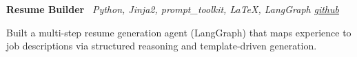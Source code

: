     \hspace{0.5em} \textbf{Resume Builder} \textbar \  \textit{Python, Jinja2, prompt\_toolkit, LaTeX, LangGraph}
\hfill \textit{\href{https://github.com/knarfthekant/resume_builder}{github}}
    \vspace{0.10 cm}
    \begin{onecolentry}
        \begin{highlights}
            \item Built a multi-step resume generation agent (LangGraph) that maps experience to job descriptions via structured reasoning and template-driven generation.
        \end{highlights}
    \end{onecolentry}
    \vspace{0.10 cm}

